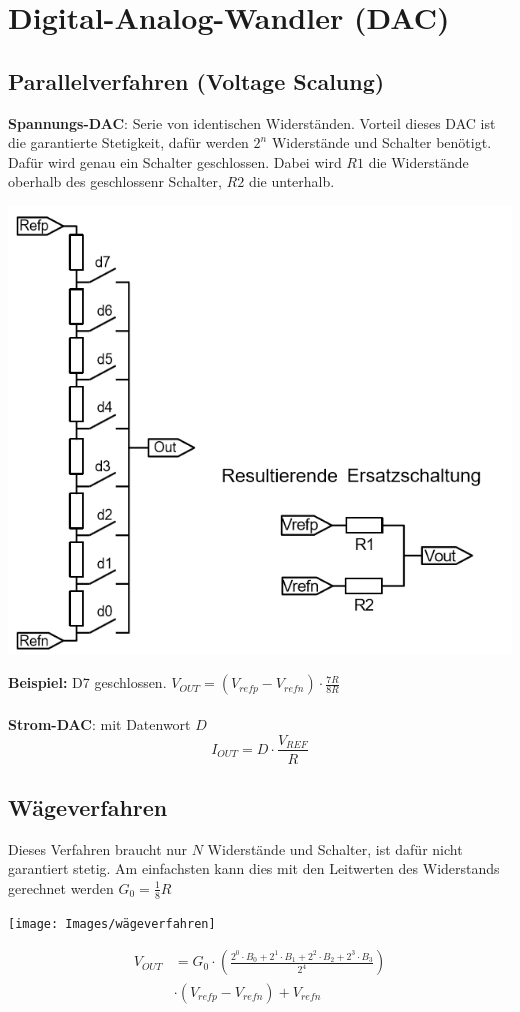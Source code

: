 \section{Digital-Analog-Wandler (DAC)}
\subsection{Parallelverfahren (Voltage Scalung)}
\textbf{Spannungs-DAC}: 
Serie von identischen Widerständen. Vorteil dieses DAC ist die garantierte Stetigkeit, dafür werden $2^n$ Widerstände und Schalter benötigt. Dafür wird genau ein Schalter geschlossen. Dabei wird $R1$ die Widerstände oberhalb des geschlossenr Schalter, $R2$ die unterhalb.
\begin{center}
	\includegraphics[width=0.7\columnwidth]{Images/dac_parallel}
\end{center}
\textbf{Beispiel:} D7 geschlossen. $V_{OUT} = (V_{refp} - V_{refn})\cdot\frac{7R}{8R}$
~\\ ~\\
\textbf{Strom-DAC}: mit Datenwort $D$
\[
I_{OUT} = D \cdot \frac{V_{REF}}{R}
\]

\subsection{Wägeverfahren}
Dieses Verfahren braucht nur $N$ Widerstände und Schalter, ist dafür nicht garantiert stetig. Am einfachsten kann dies mit den Leitwerten des Widerstands gerechnet werden $G_0 = \frac{1}{8}R$
\begin{center}
	\texttt{[image: Images/wägeverfahren]}
\end{center}
\begin{align*}
	V_{OUT} &= G_0\cdot \left(\frac{2^0 \cdot B_0 + 2^1 \cdot B_1 +2^2 \cdot B_2 + 2^3 \cdot B_3}{2^4}\right)\\ &\cdot (V_{refp} - V_{refn}) + V_{refn}
\end{align*}

